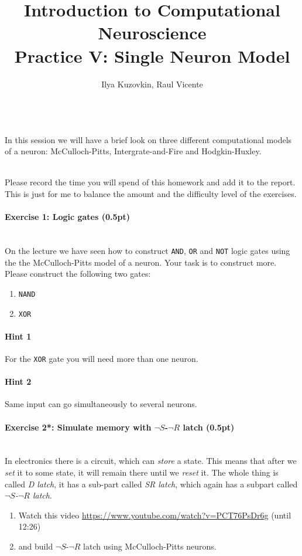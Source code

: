 \documentclass[a4paper,11pt]{article}
\author{\large{Ilya Kuzovkin, Raul Vicente}}
\title{\huge{Introduction to Computational Neuroscience}\\\LARGE{Practice V: Single Neuron Model}}
\newenvironment{exercise}[3]{\paragraph{Exercise #1: #2 (#3pt)}\ \\}{
\medskip}
\begin{document}
\maketitle


%
%
\ \\
In this session we will have a brief look on three different computational models of a neuron: McCulloch-Pitts, Intergrate-and-Fire and Hodgkin-Huxley.

\ \\
Please record the time you will spend of this homework and add it to the report. This is just for me to balance the amount and the difficulty level of the exercises.



%
%
\begin{exercise}{1}{Logic gates}{0.5}
On the lecture we have seen how to construct \texttt{AND}, \texttt{OR} and \texttt{NOT} logic gates using the the McCulloch-Pitts model of a neuron. Your task is to construct more. Please construct the following two gates:
\begin{enumerate}
\itemsep 0em
	\item \texttt{NAND}
	\item \texttt{XOR}
\end{enumerate}
\paragraph{Hint 1}For the \texttt{XOR} gate you will need more than one neuron.
\paragraph{Hint 2}Same input can go simultaneously to several neurons.
\end{exercise}


%
%
\begin{exercise}{2*}{Simulate memory with $\neg S$-$\neg R$ latch}{0.5}
In electronics there is a circuit, which can \emph{store} a state. This means that after we \emph{set} it to some state, it will remain there until we \emph{reset} it. The whole thing is called \emph{D latch}, it has a sub-part called \emph{SR latch}, which again has a subpart called \emph{$\neg S$-$\neg R$ latch}.
\begin{enumerate}
\itemsep 0em
	\item Watch this video \url{https://www.youtube.com/watch?v=PCT76PsDr6g} (until 12:26)
	\item and build $\neg S$-$\neg R$ latch using McCulloch-Pitts neurons. 
\end{enumerate}
\end{exercise}
\end{document}
